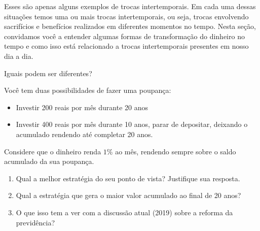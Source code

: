 Esses são apenas alguns exemplos de trocas intertemporais. Em cada uma dessas situações temos uma ou mais trocas intertemporais, ou seja, trocas envolvendo sacrifícios e benefícios realizados em diferentes momentos no tempo. Nesta seção, convidamos você a entender algumas formas de transformação do dinheiro no tempo e como isso está relacionado a trocas intertemporais presentes em nosso dia a dia.


\clearpage
\begin{task}{Iguais podem ser diferentes?}

Você tem duas possibilidades de fazer uma poupança:

\begin{itemize}

\item Investir 200 reais por mês durante 20 anos

\item Investir 400 reais por mês durante 10 anos, parar de depositar, deixando o acumulado rendendo até completar 20 anos.

\end{itemize}

Considere que o dinheiro renda $1$\% ao mês, rendendo sempre sobre o saldo acumulado da sua poupança. 

\begin{enumerate}

\item Qual a melhor estratégia do seu ponto de vista? Justifique sua resposta.

\item Qual a estratégia que gera o maior valor acumulado ao final de 20 anos?

\item O que isso tem a ver com a discussão atual (2019) sobre a reforma da previdência?
\end{enumerate}

\end{task}

